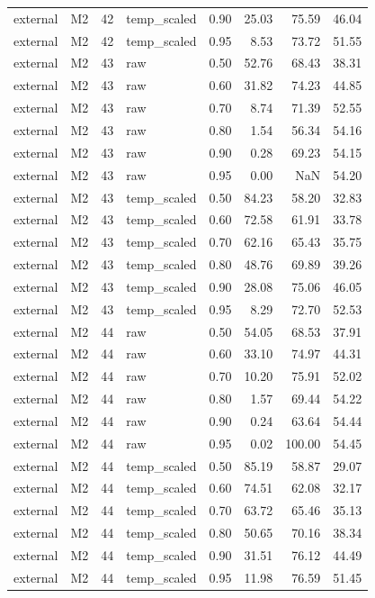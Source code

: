\begin{tabular}{llrlrrrr}
external & M2 & 42 & temp\_scaled & 0.90 & 25.03 & 75.59 & 46.04 \\
external & M2 & 42 & temp\_scaled & 0.95 & 8.53 & 73.72 & 51.55 \\
external & M2 & 43 & raw & 0.50 & 52.76 & 68.43 & 38.31 \\
external & M2 & 43 & raw & 0.60 & 31.82 & 74.23 & 44.85 \\
external & M2 & 43 & raw & 0.70 & 8.74 & 71.39 & 52.55 \\
external & M2 & 43 & raw & 0.80 & 1.54 & 56.34 & 54.16 \\
external & M2 & 43 & raw & 0.90 & 0.28 & 69.23 & 54.15 \\
external & M2 & 43 & raw & 0.95 & 0.00 & NaN & 54.20 \\
external & M2 & 43 & temp\_scaled & 0.50 & 84.23 & 58.20 & 32.83 \\
external & M2 & 43 & temp\_scaled & 0.60 & 72.58 & 61.91 & 33.78 \\
external & M2 & 43 & temp\_scaled & 0.70 & 62.16 & 65.43 & 35.75 \\
external & M2 & 43 & temp\_scaled & 0.80 & 48.76 & 69.89 & 39.26 \\
external & M2 & 43 & temp\_scaled & 0.90 & 28.08 & 75.06 & 46.05 \\
external & M2 & 43 & temp\_scaled & 0.95 & 8.29 & 72.70 & 52.53 \\
external & M2 & 44 & raw & 0.50 & 54.05 & 68.53 & 37.91 \\
external & M2 & 44 & raw & 0.60 & 33.10 & 74.97 & 44.31 \\
external & M2 & 44 & raw & 0.70 & 10.20 & 75.91 & 52.02 \\
external & M2 & 44 & raw & 0.80 & 1.57 & 69.44 & 54.22 \\
external & M2 & 44 & raw & 0.90 & 0.24 & 63.64 & 54.44 \\
external & M2 & 44 & raw & 0.95 & 0.02 & 100.00 & 54.45 \\
external & M2 & 44 & temp\_scaled & 0.50 & 85.19 & 58.87 & 29.07 \\
external & M2 & 44 & temp\_scaled & 0.60 & 74.51 & 62.08 & 32.17 \\
external & M2 & 44 & temp\_scaled & 0.70 & 63.72 & 65.46 & 35.13 \\
external & M2 & 44 & temp\_scaled & 0.80 & 50.65 & 70.16 & 38.34 \\
external & M2 & 44 & temp\_scaled & 0.90 & 31.51 & 76.12 & 44.49 \\
external & M2 & 44 & temp\_scaled & 0.95 & 11.98 & 76.59 & 51.45 \\

\end{tabular}
